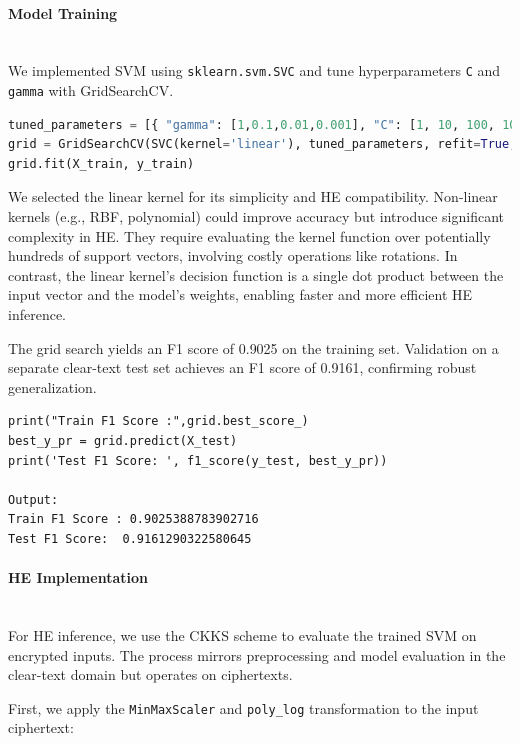 \documentclass[article]{iacrtrans}
\begin{document}
\paragraph{Model Training}\mbox{}\\

We implemented SVM using \texttt{sklearn.svm.SVC} and tune hyperparameters \texttt{C} and \texttt{gamma} with GridSearchCV.

\begin{lstlisting}[language=Python]
tuned_parameters = [{ "gamma": [1,0.1,0.01,0.001], "C": [1, 10, 100, 1000]}]
grid = GridSearchCV(SVC(kernel='linear'), tuned_parameters, refit=True, cv=5, scoring='f1')
grid.fit(X_train, y_train)
\end{lstlisting}

We selected the linear kernel for its simplicity and HE compatibility. Non-linear kernels (e.g., RBF, polynomial) could improve accuracy but introduce significant complexity in HE. They require evaluating the kernel function over potentially hundreds of support vectors, involving costly operations like rotations. In contrast, the linear kernel’s decision function is a single dot product between the input vector and the model’s weights, enabling faster and more efficient HE inference.

The grid search yields an F1 score of 0.9025 on the training set. Validation on a separate clear-text test set achieves an F1 score of 0.9161, confirming robust generalization.

\begin{lstlisting}
print("Train F1 Score :",grid.best_score_)
best_y_pr = grid.predict(X_test)
print('Test F1 Score: ', f1_score(y_test, best_y_pr))
    
Output:
Train F1 Score : 0.9025388783902716
Test F1 Score:  0.9161290322580645
\end{lstlisting}

\paragraph{HE Implementation}\mbox{}\\

For HE inference, we use the CKKS scheme to evaluate the trained SVM on encrypted inputs. The process mirrors preprocessing and model evaluation in the clear-text domain but operates on ciphertexts.

First, we apply the \texttt{MinMaxScaler} and \texttt{poly\_log} transformation to the input ciphertext:
\end{document}
